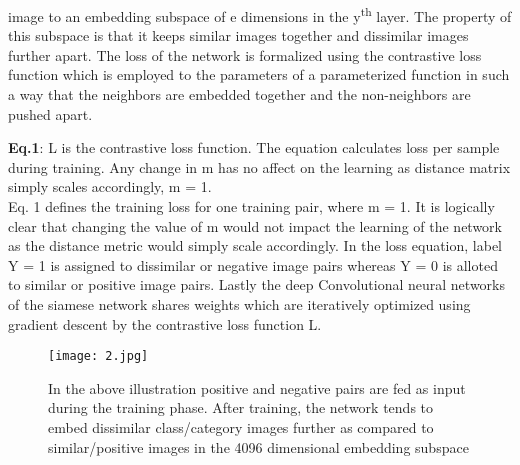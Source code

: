 \documentclass[10pt,twocolumn,letterpaper]{article}
\begin{document}
image to an embedding subspace of e dimensions in the y\textsuperscript{th} layer. The property of this subspace is that it keeps similar images together and dissimilar images further apart. The loss of the network is formalized using the contrastive loss function  \cite{c23} which is employed to the parameters of a parameterized function in such a way that the neighbors are embedded together and the non-neighbors are pushed apart.


\textbf{Eq.1}:  L is the contrastive loss function. The equation calculates loss per sample during training. Any change in m has no affect on the learning as distance matrix simply scales accordingly, m = 1.\\


Eq. 1 defines the training loss for one training pair, where m = 1. It is logically clear that changing the value of m would not impact the learning of the network as the distance metric would simply scale accordingly. In the loss equation, label Y = 1 is assigned to dissimilar or negative image pairs whereas Y = 0 is alloted to similar or positive image pairs. Lastly the deep Convolutional neural networks of the siamese network shares weights which are iteratively optimized using gradient descent by the contrastive loss function L.\\
\begin{figure}[htp]
\centering
\texttt{[image: 2.jpg]}
\caption{In the above illustration positive and negative pairs are fed as input during the training phase. After training, the network tends to embed dissimilar class/category images further as compared to similar/positive images in the 4096 dimensional embedding subspace}
\label{fig:captioning}
\end{figure}
\vspace{-2mm}
\end{document}

